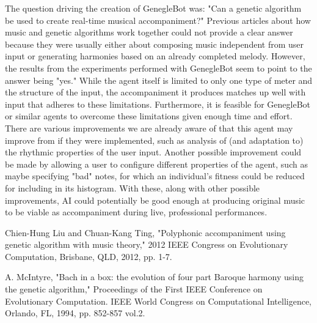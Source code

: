 \documentclass[conference]{IEEEtran}
\begin{document}
The question driving the creation of GenegleBot was: "Can a genetic algorithm be used to create real-time musical accompaniment?" Previous articles about how music and genetic algorithms work together could not provide a clear answer because they were usually either about composing music independent from user input or generating harmonies based on an already completed melody.  However, the results from the experiments performed with GenegleBot seem to point to the answer being "yes."  While the agent itself is limited to only one type of meter and the structure of the input, the accompaniment it produces matches up well with input that adheres to these limitations.  Furthermore, it is feasible for GenegleBot or similar agents to overcome these limitations given enough time and effort. There are various improvements we are already aware of that this agent may improve from if they were implemented, such as analysis of (and adaptation to) the rhythmic properties of the user input. Another possible improvement could be made by allowing a user to configure different properties of the agent, such as maybe specifying "bad" notes, for which an individual's fitness could be reduced for including in its histogram. With these, along with other possible improvements, AI could potentially be good enough at producing original music to be viable as accompaniment during live, professional performances.

\begin{thebibliography}{1}
	
	Chien-Hung Liu and Chuan-Kang Ting, "Polyphonic accompaniment using genetic algorithm with music theory," 2012 IEEE Congress on Evolutionary Computation, Brisbane, QLD, 2012, pp. 1-7.
		
	A. McIntyre, "Bach in a box: the evolution of four part Baroque harmony using the genetic algorithm," Proceedings of the First IEEE Conference on Evolutionary Computation. IEEE World Congress on Computational Intelligence, Orlando, FL, 1994, pp. 852-857 vol.2.
			
	
	
\end{thebibliography}

	
\end{document}
